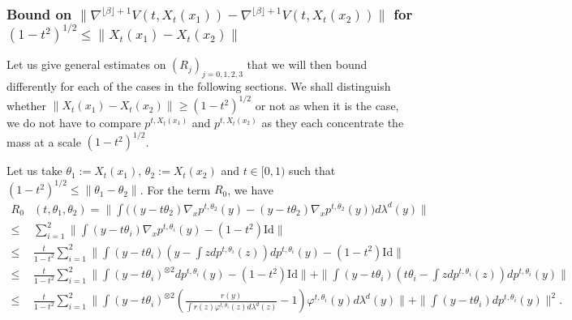 \documentclass{article}
\begin{document}
\subsubsection{Bound on $\|\nabla^{\lfloor \beta \rfloor+1} V(t,X_t(x_1))-\nabla^{\lfloor \beta \rfloor+1} V(t,X_t(x_2))\|$ for $(1-t^2)^{1/2}\leq \| X_t(x_1)- X_t(x_2)\|$ }\label{sec:boundnablavx1x2}
Let us give general estimates on $(R_j)_{j=0,1,2,3}$ that we will then bound differently for each of the cases in the following sections. We shall distinguish whether $\| X_t(x_1)- X_t(x_2)\|\geq (1-t^2)^{1/2}$ or not as when it is the case, we do not have to compare $p^{t,X_t(x_1)}$ and $p^{t,X_t(x_2)}$ as they each concentrate the mass at a scale $(1-t^2)^{1/2}$. 

Let us take $\theta_1:= X_t(x_1)$, $\theta_2:=X_t(x_2)$ and $t\in [0,1)$ such that $(1-t^2)^{1/2}\leq \|\theta_1-\theta_2\|$. For the term $R_0$, we have
\begin{align}
R_0&(t,\theta_1,\theta_2) = \|\int\Big((y-t\theta_2)\nabla_x p^{t,\theta_2}(y)-(y-t\theta_2)\nabla_x p^{t,\theta_2}(y)\Big)d\lambda^d(y)\|\nonumber\\
         \leq & \sum_{i=1}^2 \|\int(y-t\theta_i)\nabla_x p^{t,\theta_i}(y)-(1-t^2)\text{Id}\|\label{eq:roboundtpetit2}\\
         \leq & \frac{t}{1-t^2}\sum_{i=1}^2 \|\int(y-t\theta_i)\left(y-\int zdp^{t,\theta_i}(z)\right)d p^{t,\theta_i}(y)-(1-t^2)\text{Id}\|\nonumber\\
         \leq & \frac{t}{1-t^2}\sum_{i=1}^2 \|\int(y-t\theta_i)^{\otimes2}d p^{t,\theta_i}(y)-(1-t^2)\text{Id}\|+\|\int(y-t\theta_i)\left(t\theta_i-\int zdp^{t,\theta_i}(z)\right)d p^{t,\theta_i}(y)\|\nonumber\\
         \leq & \frac{t}{1-t^2}\sum_{i=1}^2\|\int\left(y-t\theta_i\right)^{\otimes2}\left( \frac{r(y)}{\int r(z)\varphi^{t,\theta_i}(z)d\lambda^d(z)}-1\right)\varphi^{t,\theta_i}(y)d\lambda^d(y)\|+\|\int(y-t\theta_i)d p^{t,\theta_i}(y)\|^2\label{eq:roboundtpetit}.
\end{align}
\end{document}

